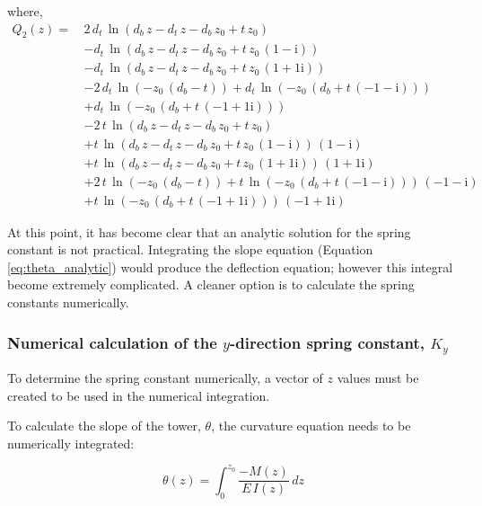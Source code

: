 where,
\begin{align*}
	Q_2(z) =\, &2\,d_{t}\,\ln\left(d_{b}\,z-d_{t}\,z-d_{b}\,z_{0}+t\,z_{0}\right) \\
	&-d_{t}\,\ln\left(d_{b}\,z-d_{t}\,z-d_{b}\,z_{0}+t\,z_{0}\,\left(1-\mathrm{i}\right)\right) \\
	&-d_{t}\,\ln\left(d_{b}\,z-d_{t}\,z-d_{b}\,z_{0}+t\,z_{0}\,\left(1+1{}\mathrm{i}\right)\right) \\
	&-2\,d_{t}\,\ln\left(-z_{0}\,\left(d_{b}-t\right)\right)+d_{t}\,\ln\left(-z_{0}\,\left(d_{b}+t\,\left(-1-\mathrm{i}\right)\right)\right) \\
	&+d_{t}\,\ln\left(-z_{0}\,\left(d_{b}+t\,\left(-1+1{}\mathrm{i}\right)\right)\right) \\
	&-2\,t\,\ln\left(d_{b}\,z-d_{t}\,z-d_{b}\,z_{0}+t\,z_{0}\right) \\
	&+t\,\ln\left(d_{b}\,z-d_{t}\,z-d_{b}\,z_{0}+t\,z_{0}\,\left(1-\mathrm{i}\right)\right)\,\left(1-\mathrm{i}\right) \\
	&+t\,\ln\left(d_{b}\,z-d_{t}\,z-d_{b}\,z_{0}+t\,z_{0}\,\left(1+1{}\mathrm{i}\right)\right)\,\left(1+1{}\mathrm{i}\right) \\
	&+2\,t\,\ln\left(-z_{0}\,\left(d_{b}-t\right)\right)+t\,\ln\left(-z_{0}\,\left(d_{b}+t\,\left(-1-\mathrm{i}\right)\right)\right)\,\left(-1-\mathrm{i}\right) \\
	&+t\,\ln\left(-z_{0}\,\left(d_{b}+t\,\left(-1+1{}\mathrm{i}\right)\right)\right)\,\left(-1+1{}\mathrm{i}\right)
\end{align*}

At this point, it has become clear that an analytic solution for the spring constant is not practical.  Integrating the slope equation (Equation \ref{eq:theta_analytic}) would produce the deflection equation; however this integral become extremely complicated.  A cleaner option is to calculate the spring constants numerically.

\subsubsection{Numerical calculation of the $y$-direction spring constant, $K_y$}
To determine the spring constant numerically, a vector of $z$ values must be created to be used in the numerical integration. 

To calculate the slope of the tower, $\theta$, the curvature equation needs to be numerically integrated:

\begin{equation}
	\theta(z) = \int_0^{z_0}{\frac{-M(z)}{E\,I(z)}\,dz}
\end{equation}

